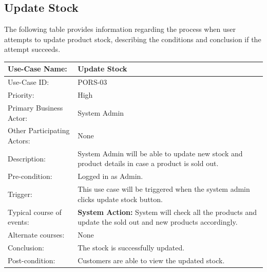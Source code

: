 \subsection{Update Stock}
The following table provides information regarding the process when user attempts to update product stock, describing the conditions and conclusion if the attempt succeeds. 
\begin{center}
    \begin{tabular}{ @{}|p{5cm}||p{7cm}|  }
    \hline
    Use-Case Name: & Update Stock  \\ \hline
    Use-Case ID: & PORS-03 \\ \hline
    Priority: & High \\ \hline
    Primary Business Actor: & System Admin \\ \hline
    Other Participating Actors: & None \\ \hline
    Description: & System Admin will be able to update new stock and product details in case a product is sold out. \\ \hline
    Pre-condition: & Logged in as Admin.  \\ \hline
    Trigger: & This use case will be triggered when the system admin clicks update stock button. \\ \hline
    Typical course of events: & \textbf{System Action:} \newline System will check all the products and update the sold out and new products accordingly.
 \\ \hline
    Alternate courses: & None \\ \hline
    Conclusion: & The stock is successfully updated. \\ \hline
    Post-condition: & Customers are able to view the updated stock.\\ \hline
    \end{tabular}
\end{center}


